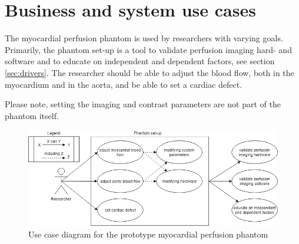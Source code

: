 \section{Business and system use cases}	
The myocardial perfusion phantom is used by researchers with varying goals. Primarily, the phantom set-up is a tool to validate perfusion imaging hard- and software and to educate on independent and dependent factors, see section \ref{sec:drivers}. The researcher should be able to adjust the blood flow, both in the myocardium and in the aorta, and be able to set a cardiac defect.

Please note, setting the imaging and contrast parameters are not part of the phantom itself. 
\begin{figure}
	\includegraphics[width=\textwidth]{./images/usecase_diagram.png}
	\caption{Use case diagram for the prototype myocardial perfusion phantom}
	\label{fig:usecase}
\end{figure}

